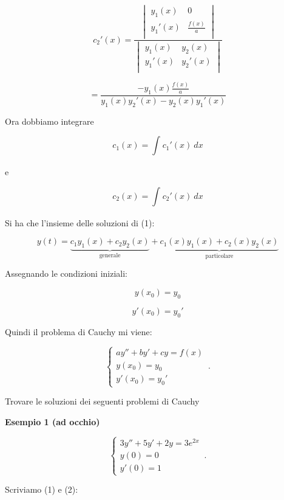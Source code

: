 \documentclass[../appunti-analisi.tex]{subfiles}
\begin{document}
\[
c_2'(x) = 
    \frac{
\begin{vmatrix}
y_1(x) & 0  \\
y_1'(x) & \frac{f(x)}{a}  \\
\end{vmatrix}
    }{
\begin{vmatrix}
y_1(x) & y_2(x)  \\
y_1'(x) & y_2'(x)  \\
\end{vmatrix}
    }
\]

\[
    = \frac{- y_1(x) \frac{f(x)}{a}}{y_1(x) y_2'(x) - y_2(x) y_1'(x)}
\]

Ora dobbiamo integrare

\[
    c_1(x) = \int_{}^{} {c_1'(x)} \: dx 
\]

e

\[
    c_2(x) = \int_{}^{} {c_2'(x)} \: dx 
\]

Si ha che l'insieme delle soluzioni di (1):

\[
    y(t)  = \underbrace{c_1 y_1(x) + c_2 y_2(x)}_\text{generale} + \underbrace{c_1(x) y_1(x) + c_2(x) y_2(x)}_\text{particolare}
\]

Assegnando le condizioni iniziali: 

\[
    y(x_0) = y_0
\]

\[
    y'(x_0) = y_0'
\]

Quindi il problema di Cauchy mi viene:

    \begin{equation}
        \begin{cases}
            ay''+ by'+cy= f(x)\\
            y(x_0)=y_0\\
            y'(x_0) = y_0'
        \end{cases}\,.
    \end{equation}

Trovare le soluzioni dei seguenti problemi di Cauchy

\textbf{Esempio 1 (ad occhio)} 

    \begin{equation}
        \begin{cases}
            3y'' + 5y' + 2y=3e ^{2x}\\
            y(0) = 0\\
            y'(0) = 1
        \end{cases}\,.
    \end{equation}

Scriviamo (1) e (2):
\end{document}
